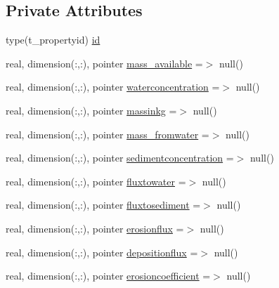 \subsection*{Private Attributes}
\begin{DoxyCompactItemize}
\item 
type(t\+\_\+propertyid) \mbox{\hyperlink{structmoduleinterfacesedimentwater_1_1t__property_a62ff888fabff35c34b6ebe2f4bb27cb4}{id}}
\item 
real, dimension(\+:,\+:), pointer \mbox{\hyperlink{structmoduleinterfacesedimentwater_1_1t__property_a035a8b3f89b9db9c0cf8de343a2cc94a}{mass\+\_\+available}} =$>$ null()
\item 
real, dimension(\+:,\+:), pointer \mbox{\hyperlink{structmoduleinterfacesedimentwater_1_1t__property_a196c2229f0f04af4817809438737190c}{waterconcentration}} =$>$ null()
\item 
real, dimension(\+:,\+:), pointer \mbox{\hyperlink{structmoduleinterfacesedimentwater_1_1t__property_a5fe400cce908afdb5e36dc527128dacd}{massinkg}} =$>$ null()
\item 
real, dimension(\+:,\+:), pointer \mbox{\hyperlink{structmoduleinterfacesedimentwater_1_1t__property_acf0d6a7ee1d1dbf0ca9fe846c5247567}{mass\+\_\+fromwater}} =$>$ null()
\item 
real, dimension(\+:,\+:), pointer \mbox{\hyperlink{structmoduleinterfacesedimentwater_1_1t__property_a509d2223ef53c8e4f00d6cd6af15faaf}{sedimentconcentration}} =$>$ null()
\item 
real, dimension(\+:,\+:), pointer \mbox{\hyperlink{structmoduleinterfacesedimentwater_1_1t__property_a6c0e9f1d7fdf57c609720cd77f9ddf3d}{fluxtowater}} =$>$ null()
\item 
real, dimension(\+:,\+:), pointer \mbox{\hyperlink{structmoduleinterfacesedimentwater_1_1t__property_a8508b8c1e23dea82900ef5977afab743}{fluxtosediment}} =$>$ null()
\item 
real, dimension(\+:,\+:), pointer \mbox{\hyperlink{structmoduleinterfacesedimentwater_1_1t__property_a01e575178952b2dd2c36ea6f115a7896}{erosionflux}} =$>$ null()
\item 
real, dimension(\+:,\+:), pointer \mbox{\hyperlink{structmoduleinterfacesedimentwater_1_1t__property_a26e974b03d3f1474ad3ab47c11c6f7f8}{depositionflux}} =$>$ null()
\item 
real, dimension(\+:,\+:), pointer \mbox{\hyperlink{structmoduleinterfacesedimentwater_1_1t__property_aa62618803fcbe14e3895366b63d06a3a}{erosioncoefficient}} =$>$ null()
\item 

\end{DoxyCompactItemize}
